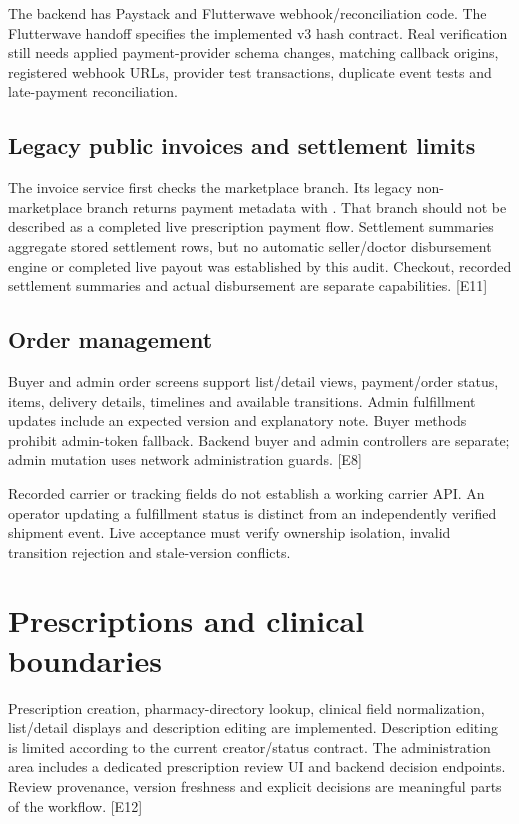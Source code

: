 \documentclass[11pt,a4paper]{article}
\newcommand{\source}[1]{{\small\path{#1}}}
\newcommand{\evidence}[1]{\textcolor{muted}{[E#1]}}
\begin{document}
The backend has Paystack and Flutterwave webhook/reconciliation code. The Flutterwave handoff specifies the implemented v3 hash contract. Real verification still needs applied payment-provider schema changes, matching callback origins, registered webhook URLs, provider test transactions, duplicate event tests and late-payment reconciliation.

\subsection{Legacy public invoices and settlement limits}
The invoice service first checks the marketplace branch. Its legacy non-marketplace branch returns payment metadata with \source{isDemo: true}. That branch should not be described as a completed live prescription payment flow. Settlement summaries aggregate stored settlement rows, but no automatic seller/doctor disbursement engine or completed live payout was established by this audit. Checkout, recorded settlement summaries and actual disbursement are separate capabilities. \evidence{11}

\subsection{Order management}
Buyer and admin order screens support list/detail views, payment/order status, items, delivery details, timelines and available transitions. Admin fulfillment updates include an expected version and explanatory note. Buyer methods prohibit admin-token fallback. Backend buyer and admin controllers are separate; admin mutation uses network administration guards. \evidence{8}

Recorded carrier or tracking fields do not establish a working carrier API. An operator updating a fulfillment status is distinct from an independently verified shipment event. Live acceptance must verify ownership isolation, invalid transition rejection and stale-version conflicts.

\section{Prescriptions and clinical boundaries}
Prescription creation, pharmacy-directory lookup, clinical field normalization, list/detail displays and description editing are implemented. Description editing is limited according to the current creator/status contract. The administration area includes a dedicated prescription review UI and backend decision endpoints. Review provenance, version freshness and explicit decisions are meaningful parts of the workflow. \evidence{12}
\end{document}
